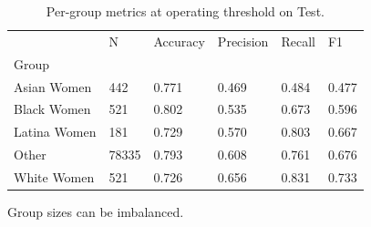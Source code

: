 \begin{table}[htbp]
\centering
\caption{Per-group metrics at operating threshold on Test.}
\label{tab:08-group-metrics-selfcheck}
\begin{tabular}{llllll}
\toprule
 & N & Accuracy & Precision & Recall & F1 \\
Group &  &  &  &  &  \\
\midrule
Asian Women & 442 & 0.771 & 0.469 & 0.484 & 0.477 \\
Black Women & 521 & 0.802 & 0.535 & 0.673 & 0.596 \\
Latina Women & 181 & 0.729 & 0.570 & 0.803 & 0.667 \\
Other & 78335 & 0.793 & 0.608 & 0.761 & 0.676 \\
White Women & 521 & 0.726 & 0.656 & 0.831 & 0.733 \\
\bottomrule
\end{tabular}

\begin{tablenotes}[flushleft]
\item \small{Group sizes can be imbalanced.}
\end{tablenotes}
\end{table}